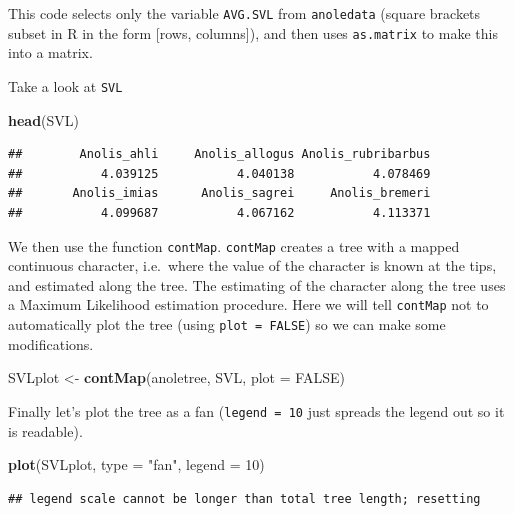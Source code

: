 \documentclass[]{book}
\newenvironment{Shaded}{\begin{snugshade}}{\end{snugshade}}
\newcommand{\KeywordTok}[1]{\textcolor[rgb]{0.13,0.29,0.53}{\textbf{{#1}}}}
\newcommand{\DataTypeTok}[1]{\textcolor[rgb]{0.13,0.29,0.53}{{#1}}}
\newcommand{\DecValTok}[1]{\textcolor[rgb]{0.00,0.00,0.81}{{#1}}}
\newcommand{\StringTok}[1]{\textcolor[rgb]{0.31,0.60,0.02}{{#1}}}
\newcommand{\OtherTok}[1]{\textcolor[rgb]{0.56,0.35,0.01}{{#1}}}
\newcommand{\NormalTok}[1]{{#1}}
\begin{document}
This code selects only the variable \texttt{AVG.SVL} from
\texttt{anoledata} (square brackets subset in R in the form {[}rows,
columns{]}), and then uses \texttt{as.matrix} to make this into a
matrix.

Take a look at \texttt{SVL}

\begin{Shaded}
\begin{Highlighting}[]
\KeywordTok{head}\NormalTok{(SVL)}
\end{Highlighting}
\end{Shaded}

\begin{verbatim}
##        Anolis_ahli     Anolis_allogus Anolis_rubribarbus 
##           4.039125           4.040138           4.078469 
##       Anolis_imias      Anolis_sagrei     Anolis_bremeri 
##           4.099687           4.067162           4.113371
\end{verbatim}

We then use the function \texttt{contMap}. \texttt{contMap} creates a
tree with a mapped continuous character, i.e.~where the value of the
character is known at the tips, and estimated along the tree. The
estimating of the character along the tree uses a Maximum Likelihood
estimation procedure. Here we will tell \texttt{contMap} not to
automatically plot the tree (using \texttt{plot\ =\ FALSE}) so we can
make some modifications.

\begin{Shaded}
\begin{Highlighting}[]
\NormalTok{SVLplot <-}\StringTok{ }\KeywordTok{contMap}\NormalTok{(anoletree, SVL, }\DataTypeTok{plot =} \OtherTok{FALSE}\NormalTok{)}
\end{Highlighting}
\end{Shaded}

Finally let's plot the tree as a fan (\texttt{legend\ =\ 10} just
spreads the legend out so it is readable).

\begin{Shaded}
\begin{Highlighting}[]
\KeywordTok{plot}\NormalTok{(SVLplot, }\DataTypeTok{type =} \StringTok{"fan"}\NormalTok{, }\DataTypeTok{legend =} \DecValTok{10}\NormalTok{)}
\end{Highlighting}
\end{Shaded}

\begin{verbatim}
## legend scale cannot be longer than total tree length; resetting
\end{verbatim}
\end{document}
